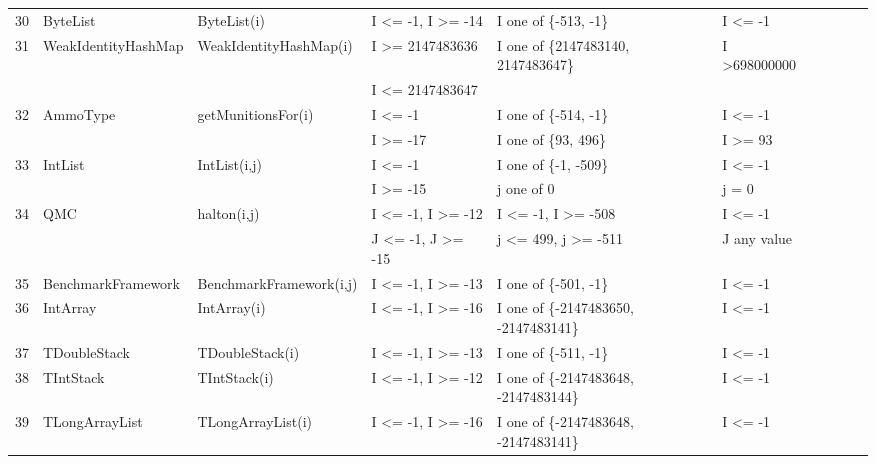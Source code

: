 \documentclass[runningheads,a4paper]{llncs}
\begin{document}
\begin{table}[h]
{{\begin{tabular}{|l|l|l|l|l|l|l|l|l|l|}
30	& ByteList					& ByteList(i)					& I \textless= -1, I \textgreater= -14			& I one of \{-513, -1\}	 				& I \textless= -1						\\ 
31	& WeakIdentityHashMap		& WeakIdentityHashMap(i)		& I \textgreater= 2147483636				& I one of \{2147483140, 2147483647\}	& I \textgreater 698000000			\\ 
	&                                             &                                             & I \textless= 2147483647					& 										&  			   						\\
32	& AmmoType				& getMunitionsFor(i)			& I \textless= -1								& I one of \{-514, -1\}					& I \textless= -1 					\\ 			
	&                                             &                                             & I \textgreater= -17							& I one of \{93, 496\}						& I \textgreater= 93		   			\\
33	& IntList						& IntList(i,j)					& I \textless= -1								& I one of \{-1, -509\}					& I \textless= -1						\\ 		
	&                                             &                                             & I \textgreater= -15							& j one of {0}								& j = 0		   						\\
34	& QMC						& halton(i,j)					& I \textless= -1, I \textgreater= -12			& I \textless= -1, I \textgreater= -508		& I \textless= -1						\\ 
	&                                             &                                             & J \textless= -1, J \textgreater= -15			& j \textless= 499, j \textgreater= -511	& J any value			 		  		\\	
35	& BenchmarkFramework		& BenchmarkFramework(i,j)	& I \textless= -1, I \textgreater= -13			& I one of \{-501, -1\}					& I \textless= -1						\\ 
36	& IntArray					& IntArray(i)					& I \textless= -1, I \textgreater= -16			& I one of \{-2147483650, -2147483141\}	& I \textless= -1						\\ 
37	& TDoubleStack				& TDoubleStack(i)			& I \textless= -1, I \textgreater= -13			& I one of \{-511, -1\}					& I \textless= -1						\\ 
38	& TIntStack					& TIntStack(i)				& I \textless= -1, I \textgreater= -12			& I one of \{-2147483648, -2147483144\}	& I \textless= -1						\\ 
39	& TLongArrayList				& TLongArrayList(i)			& I \textless= -1, I \textgreater= -16			& I one of \{-2147483648, -2147483141\}	& I \textless= -1						\\ 

\end{tabular}}}
\end{table}
\end{document}
